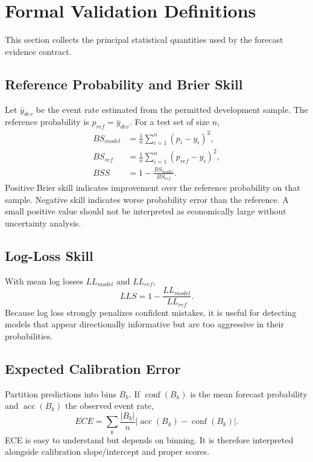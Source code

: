 \documentclass[11pt]{article}
\begin{document}
\section{Formal Validation Definitions}
This section collects the principal statistical quantities used by the forecast evidence contract.

\subsection{Reference Probability and Brier Skill}
Let $\bar y_{dev}$ be the event rate estimated from the permitted development sample. The reference probability is $p_{ref}=\bar y_{dev}$. For a test set of size $n$,
\begin{align}
BS_{model} &= \frac{1}{n}\sum_{i=1}^n(p_i-y_i)^2,\\
BS_{ref} &= \frac{1}{n}\sum_{i=1}^n(p_{ref}-y_i)^2,\\
BSS &= 1-\frac{BS_{model}}{BS_{ref}}.
\end{align}
Positive Brier skill indicates improvement over the reference probability on that sample. Negative skill indicates worse probability error than the reference. A small positive value should not be interpreted as economically large without uncertainty analysis.

\subsection{Log-Loss Skill}
With mean log losses $LL_{model}$ and $LL_{ref}$,
\begin{equation}
LLS=1-\frac{LL_{model}}{LL_{ref}}.
\end{equation}
Because log loss strongly penalizes confident mistakes, it is useful for detecting models that appear directionally informative but are too aggressive in their probabilities.

\subsection{Expected Calibration Error}
Partition predictions into bins $B_k$. If $\operatorname{conf}(B_k)$ is the mean forecast probability and $\operatorname{acc}(B_k)$ the observed event rate,
\begin{equation}
ECE=\sum_k\frac{|B_k|}{n}\left|\operatorname{acc}(B_k)-\operatorname{conf}(B_k)\right|.
\end{equation}
ECE is easy to understand but depends on binning. It is therefore interpreted alongside calibration slope/intercept and proper scores.
\end{document}
